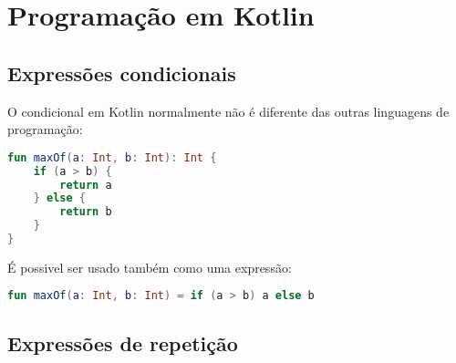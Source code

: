 

\chapter{ Programa\c{c}\~{a}o em Kotlin}


\section{Expressões condicionais}
O condicional em Kotlin normalmente não é diferente das outras linguagens de programação:
\begin{lstlisting}[label={lst:example1}, language=Kotlin]
  fun maxOf(a: Int, b: Int): Int {
    if (a > b) {
        return a
    } else {
        return b
    }
}
  \end{lstlisting}
É possivel ser usado também como uma expressão:

\begin{lstlisting}[label={lst:example1}, language=Kotlin]
    fun maxOf(a: Int, b: Int) = if (a > b) a else b
  \end{lstlisting}



\section{Expressões de repetição}
